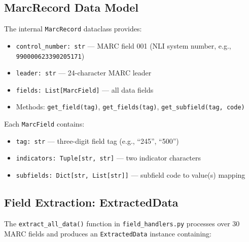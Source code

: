 \documentclass[12pt]{article}
\newcommand{\code}[1]{\texttt{#1}}
\begin{document}
\subsection{MarcRecord Data Model}

The internal \code{MarcRecord} dataclass provides:

\begin{itemize}
\item \code{control\_number: str} --- MARC field 001 (NLI system number, e.g., \code{990000623390205171})
\item \code{leader: str} --- 24-character MARC leader
\item \code{fields: List[MarcField]} --- all data fields
\item Methods: \code{get\_field(tag)}, \code{get\_fields(tag)}, \code{get\_subfield(tag, code)}
\end{itemize}

Each \code{MarcField} contains:
\begin{itemize}
\item \code{tag: str} --- three-digit field tag (e.g., ``245'', ``500'')
\item \code{indicators: Tuple[str, str]} --- two indicator characters
\item \code{subfields: Dict[str, List[str]]} --- subfield code to value(s) mapping
\end{itemize}

\subsection{Field Extraction: ExtractedData}

The \code{extract\_all\_data()} function in \code{field\_handlers.py} processes over 30 MARC fields and produces an \code{ExtractedData} instance containing:
\end{document}
